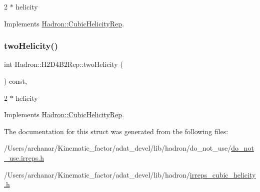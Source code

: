 2 $\ast$ helicity 

Implements \mbox{\hyperlink{structHadron_1_1CubicHelicityRep_af507aa56fc2747eacc8cb6c96db31ecc}{Hadron\+::\+Cubic\+Helicity\+Rep}}.

\mbox{\label{structHadron_1_1H2D4B2Rep_a21f6e9059862c9e6f8b6d5cbb10d8b80}} 
\subsubsection{\texorpdfstring{twoHelicity()}{twoHelicity()}\hspace{0.1cm}{\footnotesize\ttfamily [2/2]}}
{\footnotesize\ttfamily int Hadron\+::\+H2\+D4\+B2\+Rep\+::two\+Helicity (\begin{DoxyParamCaption}{ }\end{DoxyParamCaption}) const\hspace{0.3cm}{\ttfamily [inline]}, {\ttfamily [virtual]}}

2 $\ast$ helicity 

Implements \mbox{\hyperlink{structHadron_1_1CubicHelicityRep_af507aa56fc2747eacc8cb6c96db31ecc}{Hadron\+::\+Cubic\+Helicity\+Rep}}.



The documentation for this struct was generated from the following files\+:\begin{DoxyCompactItemize}
\item 
/\+Users/archanar/\+Kinematic\+\_\+factor/adat\+\_\+devel/lib/hadron/do\+\_\+not\+\_\+use/\mbox{\hyperlink{do__not__use_8irreps_8h}{do\+\_\+not\+\_\+use.\+irreps.\+h}}\item 
/\+Users/archanar/\+Kinematic\+\_\+factor/adat\+\_\+devel/lib/hadron/\mbox{\hyperlink{lib_2hadron_2irreps__cubic__helicity_8h}{irreps\+\_\+cubic\+\_\+helicity.\+h}}\end{DoxyCompactItemize}
